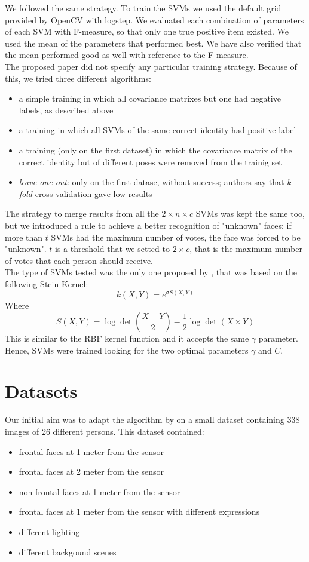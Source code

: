\documentclass{article}
\begin{document}
We followed the same strategy. To train the SVMs we used the default grid
provided by OpenCV with logstep. We evaluated each combination of parameters of
each SVM with F-measure, so that only one true positive item existed. We used
the mean of the parameters that performed best. We have also verified that the
mean performed good as well with reference to the F-measure.
\\
The proposed paper did not specify any particular training strategy. Because of
this, we tried three different algorithms:
\begin{itemize}
	\item a simple training in which all covariance matrixes but one had
		negative labels, as described above
	\item a training in which all SVMs of the same correct identity had
		positive label
	\item a training (only on the first dataset) in which the covariance
		matrix of the correct identity but of different poses were
		removed from the trainig set
	\item \textit{leave-one-out}: only on the first datase, without
		success; authors say that \textit{k-fold} cross
		validation gave low results
\end{itemize}
The strategy to merge results from all the $2 \times n \times c$ SVMs was kept
the same too, but we introduced a rule to achieve a better recognition of
"unknown" faces: if more than $t$ SVMs had the maximum number of votes, the
face was forced to be "unknown". $t$ is a threshold that we setted to $2 \times
c$, that is the maximum number of votes that each person should receive.
\\
The type of SVMs tested was the only one proposed by \citep{Hayat2016}, that
was based on the following Stein Kernel:
$$
k(X, Y) = e^{\sigma S(X,Y)}
$$
Where
$$
S(X, Y) = \log\det\left(\frac{X + Y}{2}\right)-\frac{1}{2} \log \det(X\times Y)
$$
This is similar to the RBF kernel function and it accepts the same $\gamma$
parameter. Hence, SVMs were trained looking for the two optimal parameters
$\gamma$ and $C$.

\section{Datasets}
Our initial aim was to adapt the algorithm by \citep{Hayat2016} on a small dataset
containing 338 images of 26 different persons. This dataset contained:
\begin{itemize}
	\item frontal faces at 1 meter from the sensor
	\item frontal faces at 2 meter from the sensor
	\item non frontal faces at 1 meter from the sensor
	\item frontal faces at 1 meter from the sensor with different expressions
	\item different lighting
	\item different backgound scenes
\end{itemize}
\end{document}
